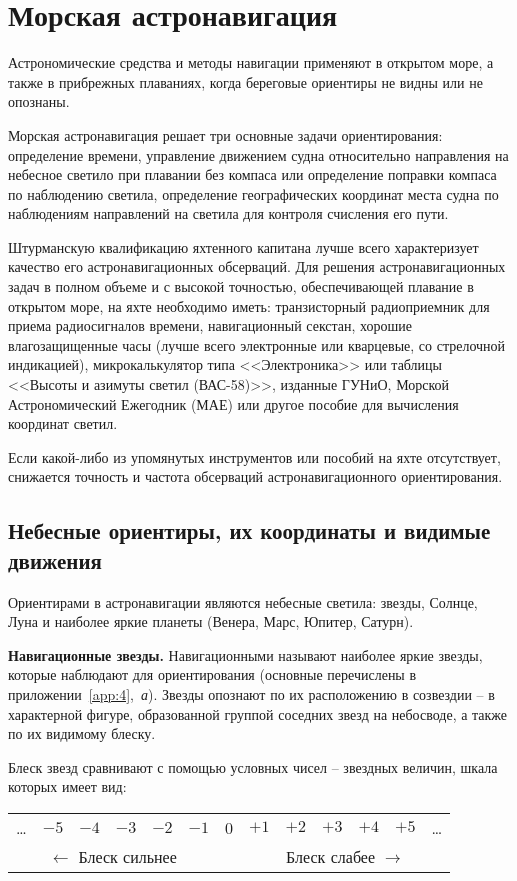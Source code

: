 \twocolumn

\chapter{Морская астронавигация}\label{chap:7}

Астрономические средства и методы навигации применяют в открытом море, а также в прибрежных плаваниях, когда береговые ориентиры не видны или не опознаны.

Морская астронавигация решает три основные задачи ориентирования: определение времени, управление движением судна относительно направления на небесное светило при плавании без компаса или определение поправки компаса по наблюдению светила, определение географических координат места судна по наблюдениям направлений на светила для контроля счисления его пути.

Штурманскую квалификацию яхтенного капитана лучше всего характеризует качество его астронавигационных обсерваций. Для решения астронавигационных задач в полном объеме и с высокой точностью, обеспечивающей плавание в открытом море, на яхте необходимо иметь: транзисторный радиоприемник для приема радиосигналов времени, навигационный секстан, хорошие влагозащищенные часы (лучше всего электронные или кварцевые, со стрелочной индикацией), микрокалькулятор типа <<Электроника>> или таблицы <<Высоты и азимуты светил (ВАС-58)>>, изданные ГУНиО, Морской Астрономический Ежегодник (МАЕ) или другое пособие для вычисления координат светил.

Если какой-либо из упомянутых инструментов или пособий на яхте отсутствует, снижается точность и частота обсерваций астронавигационного ориентирования.

\section{Небесные ориентиры, их координаты и видимые движения}\label{sec:7-1}

Ориентирами в астронавигации являются небесные светила: звезды, Солнце, Луна и наиболее яркие планеты (Венера, Марс, Юпитер, Сатурн).

\textbf{Навигационные звезды.} Навигационными называют наиболее яркие звезды, которые наблюдают для ориентирования (основные перечислены в приложении~\ref{app:4},~\textit{а}). Звезды опознают по их расположению в созвездии \--- в характерной фигуре, образованной группой соседних звезд на небосводе, а также по их видимому блеску.

\begin{table*}[!htb]
  Блеск звезд сравнивают с помощью условных чисел \--- звездных величин, шкала которых имеет вид: \\
  \centering{}
  \begin{tabular}[c]{ccccccccccccc}
    \ldots & $-5$ & $-4$ & $-3$ & $-2$ & $-1$ & 0 & $+1$ & $+2$ & $+3$ & $+4$ & $+5$ & \ldots \\
    \multicolumn{6}{c}{$\longleftarrow$ Блеск сильнее} & & \multicolumn{6}{c}{Блеск слабее $\longrightarrow$} 
  \end{tabular}
\end{table*}

